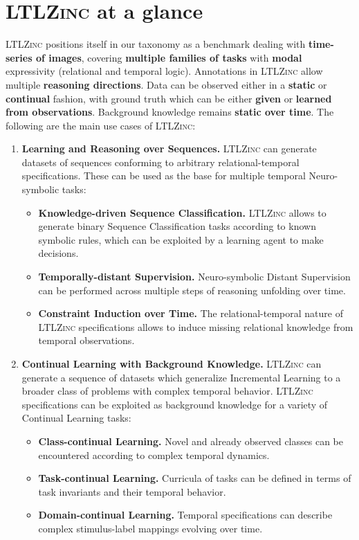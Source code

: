 \section{\textsc{LTLZinc} at a glance}
\textsc{LTLZinc} positions itself in our taxonomy as a benchmark dealing with \textbf{time-series of images}, covering \textbf{multiple families of tasks} with \textbf{modal} expressivity (relational and temporal logic). Annotations in \textsc{LTLZinc} allow multiple \textbf{reasoning directions}. Data can be observed either in a \textbf{static} or \textbf{continual} fashion, with ground truth which can be either \textbf{given} or \textbf{learned from observations}. Background knowledge remains \textbf{static over time}.
%
The following are the main use cases of \textsc{LTLZinc}:
\begin{enumerate}
	\item \textbf{Learning and Reasoning over Sequences.} \textsc{LTLZinc} can generate datasets of sequences conforming to arbitrary relational-temporal specifications. These can be used as the base for multiple temporal Neuro-symbolic tasks:
	\begin{itemize}
		\item \textbf{Knowledge-driven Sequence Classification.} \textsc{LTLZinc} allows to generate binary Sequence Classification tasks according to known symbolic rules, which can be exploited by a learning agent to make decisions.
		\item \textbf{Temporally-distant Supervision.} Neuro-symbolic Distant Supervision can be performed across multiple steps of reasoning unfolding over time.
		\item \textbf{Constraint Induction over Time.} The relational-temporal nature of \textsc{LTLZinc} specifications allows to induce missing relational knowledge from temporal observations.
	\end{itemize}
	\item \textbf{Continual Learning with Background Knowledge.} \textsc{LTLZinc} can generate a sequence of datasets which generalize Incremental Learning to a broader class of problems with complex temporal behavior. \textsc{LTLZinc} specifications can be exploited as background knowledge for a variety of Continual Learning tasks:
	\begin{itemize}
		\item \textbf{Class-continual Learning.} Novel and already observed classes can be encountered according to complex temporal dynamics.
		\item \textbf{Task-continual Learning.} Curricula of tasks can be defined in terms of task invariants and their temporal behavior.
		\item \textbf{Domain-continual Learning.} Temporal specifications can describe complex stimulus-label mappings evolving over time.
	\end{itemize}
\end{enumerate}

